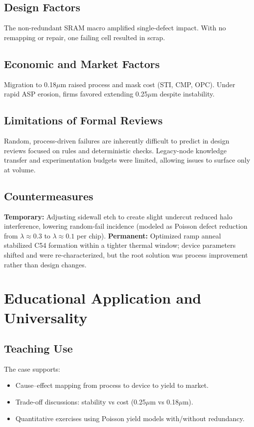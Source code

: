 \documentclass[conference]{IEEEtran}
\begin{document}
\subsection{Design Factors}
The non-redundant SRAM macro amplified single-defect impact. With no remapping or repair, one failing cell resulted in scrap.

\subsection{Economic and Market Factors}
Migration to 0.18$\mu$m raised process and mask cost (STI, CMP, OPC). Under rapid ASP erosion, firms favored extending 0.25$\mu$m despite instability.

\subsection{Limitations of Formal Reviews}
Random, process-driven failures are inherently difficult to predict in design reviews focused on rules and deterministic checks. Legacy-node knowledge transfer and experimentation budgets were limited, allowing issues to surface only at volume.

\subsection{Countermeasures}
\textbf{Temporary:} Adjusting sidewall etch to create slight undercut reduced halo interference, lowering random-fail incidence (modeled as Poisson defect reduction from $\lambda\!\approx\!0.3$ to $\lambda\!\approx\!0.1$ per chip).
\newline
\textbf{Permanent:} Optimized ramp anneal stabilized C54 formation within a tighter thermal window; device parameters shifted and were re-characterized, but the root solution was process improvement rather than design changes.

\section{Educational Application and Universality}

\subsection{Teaching Use}
The case supports:
\begin{itemize}
  \item Cause--effect mapping from process to device to yield to market.
  \item Trade-off discussions: stability vs cost (0.25$\mu$m vs 0.18$\mu$m).
  \item Quantitative exercises using Poisson yield models with/without redundancy.
\end{itemize}
\end{document}
